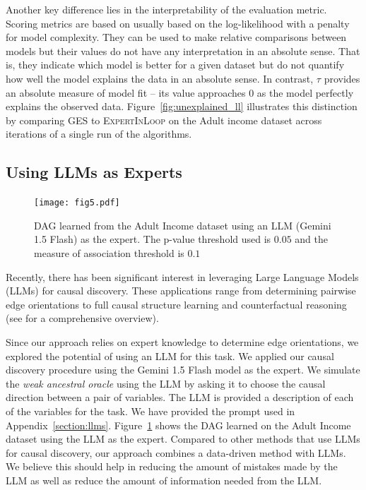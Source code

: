 \documentclass{uai2025} %
\begin{document}
Another key difference lies in the interpretability of the evaluation metric.
Scoring metrics are based on usually based on the log-likelihood with a penalty
for model complexity. They can be used to make relative comparisons between
models but their values do not have any interpretation in an absolute sense.
That is, they indicate which model is better for a given dataset but do not
quantify how well the model explains the data in an absolute sense. In
contrast, $ \tau $ provides an absolute measure of model fit -- its value
approaches $ 0 $ as the model perfectly explains the observed data.
Figure~\ref{fig:unexplained_ll} illustrates this distinction by comparing GES
to \textsc{ExpertInLoop} on the Adult income dataset across iterations of a
single run of the algorithms.

\subsection{Using LLMs as Experts}
 
\begin{figure}[t!]
	\centering
	\texttt{[image: fig5.pdf]}
	\caption{DAG learned from the Adult Income dataset using an LLM
		(Gemini 1.5 Flash) as the expert. The p-value threshold used is $ 0.05 $ 
		and the measure of association threshold is $ 0. 1 $}
	\label{fig:adult_llm}
\end{figure}

Recently, there has been significant interest in leveraging Large Language
Models (LLMs) for causal discovery. These applications range from determining
pairwise edge orientations \citep{Kiciman2023, Jin2024} to full causal
structure learning \citep{Naik2023, Vashishtha2023} and counterfactual
reasoning \citep{Kiciman2023} (see \citet{Liu2024} for a comprehensive
overview).

Since our approach relies on expert knowledge to determine edge orientations,
we explored the potential of using an LLM for this task. We applied our causal
discovery procedure using the Gemini 1.5 Flash model as the expert. We simulate
the \emph{weak ancestral oracle} using the LLM by asking it to choose the
causal direction between a pair of variables. The LLM is provided a description
of each of the variables for the task. We have provided the prompt used in
Appendix~\ref{section:llms}. Figure~\ref{fig:adult_llm} shows the DAG learned
on the Adult Income dataset using the LLM as the expert. Compared to other
methods that use LLMs for causal discovery, our approach combines a data-driven
method with LLMs. We believe this should help in reducing the amount of
mistakes made by the LLM as well as reduce the amount of information needed
from the LLM.
\end{document}
